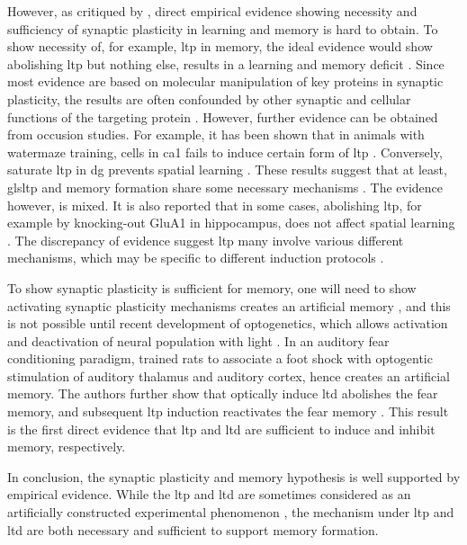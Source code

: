 However, as critiqued by \citet{neves08}, direct empirical evidence showing necessity and sufficiency of synaptic plasticity in learning and memory is hard to obtain. To show necessity of, for example, \gls{ltp} in memory, the ideal evidence would show abolishing \gls{ltp} but nothing else, results in a learning and memory deficit \citep{neves08}. Since most evidence are based on molecular manipulation of key proteins in synaptic plasticity, the results are often confounded by other synaptic and cellular functions of the targeting protein \citep{neves08}. However, further evidence can be obtained from occusion studies. For example, it has been shown that in animals with watermaze training, cells in \gls{ca1} fails to induce certain form of \gls{ltp} \citep{habib14}. Conversely, saturate \gls{ltp} in \gls{dg} prevents spatial learning \citep{moser98}. These results suggest that at least, gls{ltp} and memory formation share some necessary mechanisms \citep{takeuchi14}. The evidence however, is mixed. It is also reported that in some cases, abolishing \gls{ltp}, for example by knocking-out GluA1 in hippocampus, does not affect spatial learning \citep{zamanillo99}. The discrepancy of evidence suggest \gls{ltp} many involve various different mechanisms, which may be specific to different induction protocols \citep{neves08}.

To show synaptic plasticity is sufficient for memory, one will need to show activating synaptic plasticity mechanisms creates an artificial memory \citep{neves08}, and this is not possible until recent development of optogenetics, which allows activation and deactivation of neural population with light  \citep{zhang07, rajasethupathy16}. In an auditory fear conditioning paradigm, \citet{nabavi14} trained rats to associate a foot shock with optogentic stimulation of auditory thalamus and auditory cortex, hence creates an artificial memory. The authors further show that optically induce \gls{ltd} abolishes the fear memory, and subsequent \gls{ltp} induction reactivates the fear memory \citep{nabavi14}. This result is the first direct evidence that \gls{ltp} and \gls{ltd} are sufficient to induce and inhibit memory, respectively. 

In conclusion, the synaptic plasticity and memory hypothesis is well supported by empirical evidence. While the \gls{ltp} and \gls{ltd} are sometimes considered as an artificially constructed experimental phenomenon \citep{stevens98}, the mechanism under \gls{ltp} and \gls{ltd} are both necessary and sufficient to support memory formation.

